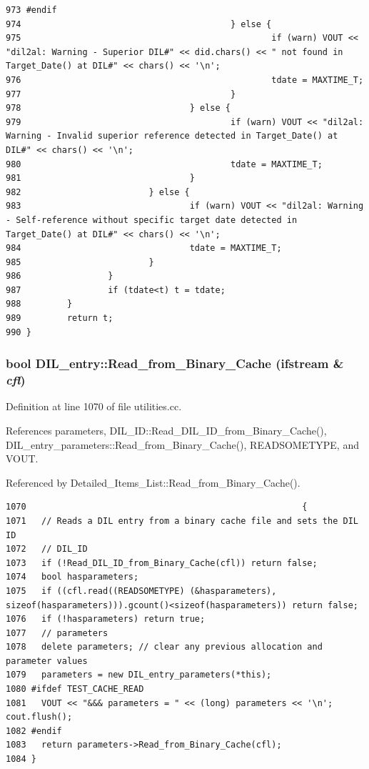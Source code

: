 \begin{verbatim}
973 #endif
974                                         } else {
975                                                 if (warn) VOUT << "dil2al: Warning - Superior DIL#" << did.chars() << " not found in Target_Date() at DIL#" << chars() << '\n';
976                                                 tdate = MAXTIME_T;
977                                         }
978                                 } else {
979                                         if (warn) VOUT << "dil2al: Warning - Invalid superior reference detected in Target_Date() at DIL#" << chars() << '\n';
980                                         tdate = MAXTIME_T;
981                                 }
982                         } else {
983                                 if (warn) VOUT << "dil2al: Warning - Self-reference without specific target date detected in Target_Date() at DIL#" << chars() << '\n';
984                                 tdate = MAXTIME_T;
985                         }
986                 }
987                 if (tdate<t) t = tdate;
988         }
989         return t;
990 }
\end{verbatim}\normalsize 
{}
\subsubsection{\setlength{\rightskip}{0pt plus 5cm}bool DIL\_\-entry::Read\_\-from\_\-Binary\_\-Cache (ifstream \& {\em cfl})}\label{classDIL__entry_a24}




Definition at line 1070 of file utilities.cc.

References parameters, DIL\_\-ID::Read\_\-DIL\_\-ID\_\-from\_\-Binary\_\-Cache(), DIL\_\-entry\_\-parameters::Read\_\-from\_\-Binary\_\-Cache(), READSOMETYPE, and VOUT.

Referenced by Detailed\_\-Items\_\-List::Read\_\-from\_\-Binary\_\-Cache().



\footnotesize\begin{verbatim}1070                                                      {
1071   // Reads a DIL entry from a binary cache file and sets the DIL ID
1072   // DIL_ID
1073   if (!Read_DIL_ID_from_Binary_Cache(cfl)) return false;
1074   bool hasparameters;
1075   if ((cfl.read((READSOMETYPE) (&hasparameters), sizeof(hasparameters))).gcount()<sizeof(hasparameters)) return false;
1076   if (!hasparameters) return true;
1077   // parameters
1078   delete parameters; // clear any previous allocation and parameter values
1079   parameters = new DIL_entry_parameters(*this);
1080 #ifdef TEST_CACHE_READ
1081   VOUT << "&&& parameters = " << (long) parameters << '\n'; cout.flush();
1082 #endif
1083   return parameters->Read_from_Binary_Cache(cfl);
1084 }
\end{verbatim}\normalsize 
{}

